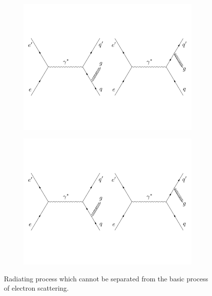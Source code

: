 \begin{figure}[tb!]
  \centering
  \begin{subfigure}[t]{0.4\textwidth}
    \includegraphics[width=\textwidth]{figs/gluon-radiation-a.pdf}
    \subcaption{{} \label{C2S3F1A}}
  \end{subfigure}
  \qquad
  \begin{subfigure}[t]{0.4\textwidth}
    \includegraphics[width=\textwidth]{figs/gluon-radiation-b.pdf}
    \subcaption{{} \label{C2S3F1B}}
  \end{subfigure}
  \caption[Gluon radiation in electron-quark scattering.]{Radiating process which cannot be separated from the basic process of electron scattering. \label{C2S3F1}}
\end{figure}

